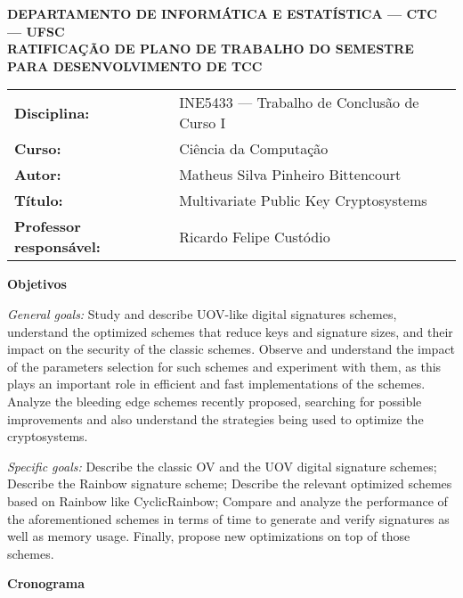 \documentclass[11pt]{letter}
\begin{document}
\pagestyle{empty}

\begin{center}
\textbf{
	DEPARTAMENTO DE INFORMÁTICA E ESTATÍSTICA --- CTC --- UFSC \\
	RATIFICAÇÃO DE PLANO DE TRABALHO DO SEMESTRE PARA DESENVOLVIMENTO DE TCC
}
\end{center}

\vspace{1em}
\setlength\extrarowheight{5pt}
\begin{tabular}{l l}
	\textbf{Disciplina:} & INE5433 --- Trabalho de Conclusão de Curso I  \\
	\textbf{Curso:}      & Ciência da Computação                         \\
	\textbf{Autor:}      & Matheus Silva Pinheiro Bittencourt            \\
	\textbf{Título:}     & Multivariate Public Key Cryptosystems         \\
	\textbf{Professor responsável:} & Ricardo Felipe Custódio            \\
\end{tabular}


\vspace{1em}
{\large \textbf{Objetivos}}

\textit{General goals:} Study and describe UOV-like digital signatures schemes,
understand the optimized schemes that reduce keys and signature sizes, and
their impact on the security of the classic schemes.  Observe and understand
the impact of the parameters selection for such schemes and experiment with
them, as this plays an important role in efficient and fast implementations of
the schemes. Analyze the bleeding edge schemes recently proposed, searching for
possible improvements and also understand the strategies being used to optimize
the cryptosystems.

\textit{Specific goals:} Describe the classic OV and the UOV digital signature
schemes; Describe the Rainbow signature scheme; Describe the relevant optimized
schemes based on Rainbow like CyclicRainbow; Compare and analyze the
performance of the aforementioned schemes in terms of time to generate and
verify signatures as well as memory usage.  Finally, propose new optimizations
on top of those schemes.

\vspace{1em}
{\large \textbf{Cronograma}}
\end{document}
